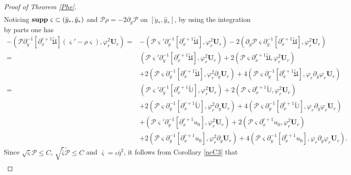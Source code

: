 \documentclass{amsart}
\numberwithin{equation}{section}
\begin{document}
\begin{proof}[Proof of Theorem \ref{Phe}]
\begin{align*}
\end{align*}
Noticing ${\bf supp}~\varsigma \subset(\check{y}_{*},\hat{y}_{*})$ and $\mathcal{P}\rho=-2\partial_{y}\mathcal{P}$ on $[\check{y}_{*},\hat{y}_{*}]$, by using the integration by parts one has
\begin{align}\label{J72}
-(\mathcal{P}\partial_{y}^{-1}[\partial_{x}^{r+1}\tilde{\mathfrak{U}}](\varsigma'-\rho\varsigma),\varphi_{r}^{2}\mathbf{U}_{r})
=&-(\mathcal{P}\varsigma'\partial_{y}^{-1}[\partial_{x}^{r+1}\tilde{\mathfrak{U}}],\varphi_{r}^{2}\mathbf{U}_{r})
  -2(\partial_{y}\mathcal{P}\varsigma\partial_{y}^{-1}[\partial_{x}^{r+1}\tilde{\mathfrak{U}}],\varphi_{r}^{2}\mathbf{U}_{r})\\
=& (\mathcal{P}\varsigma'\partial_{y}^{-1}[\partial_{x}^{r+1}\tilde{\mathfrak{U}}],\varphi_{r}^{2}\mathbf{U}_{r})
  +2(\mathcal{P}\varsigma\partial_{x}^{r+1}\tilde{\mathfrak{U}},\varphi_{r}^{2}\mathbf{U}_{r})\nonumber\\
 &+2(\mathcal{P}\varsigma\partial_{y}^{-1}[\partial_{x}^{r+1}\tilde{\mathfrak{U}}],\varphi_{r}^{2}\partial_{y}\mathbf{U}_{r})
  +4(\mathcal{P}\varsigma\partial_{y}^{-1}[\partial_{x}^{r+1}\tilde{\mathfrak{U}}],\varphi_{r}\partial_{y}\varphi_{r}\mathbf{U}_{r})\nonumber\\
=& (\mathcal{P}\varsigma'\partial_{y}^{-1}[\partial_{x}^{r+1}\tilde{\mathbb{U}}],\varphi_{r}^{2}\mathbf{U}_{r})
  +2(\mathcal{P}\varsigma\partial_{x}^{r+1}\tilde{\mathbb{U}},\varphi_{r}^{2}\mathbf{U}_{r})\nonumber\\
 &+2(\mathcal{P}\varsigma\partial_{y}^{-1}[\partial_{x}^{r+1}\tilde{\mathbb{U}}],\varphi_{r}^{2}\partial_{y}\mathbf{U}_{r})
  +4(\mathcal{P}\varsigma\partial_{y}^{-1}[\partial_{x}^{r+1}\tilde{\mathbb{U}}],\varphi_{r}\partial_{y}\varphi_{r}\mathbf{U}_{r})\nonumber\\
 &+(\mathcal{P}\varsigma'\partial_{y}^{-1}[\partial_{x}^{r+1}u_{0}],\varphi_{r}^{2}\mathbf{U}_{r})
  +2(\mathcal{P}\varsigma\partial_{x}^{r+1}u_{0},\varphi_{r}^{2}\mathbf{U}_{r})\nonumber\\
 &+2(\mathcal{P}\varsigma\partial_{y}^{-1}[\partial_{x}^{r+1}u_{0}],\varphi_{r}^{2}\partial_{y}\mathbf{U}_{r})
  +4(\mathcal{P}\varsigma\partial_{y}^{-1}[\partial_{x}^{r+1}u_{0}],\varphi_{r}\partial_{y}\varphi_{r}\mathbf{U}_{r})\nonumber.
\end{align}
Since $\sqrt{\bar{\varsigma}}\mathcal{P}\leq C$, $\sqrt{\tilde{\bar{\varsigma}}}\tilde{\mathcal{P}}\leq C$ and $\bar{\varsigma}=\iota\bar{\eta}^{2}$, it follows from Corollary \ref{ncC3} that
\begin{align}\label{J721}

\end{align}
\end{proof}
\end{document}
